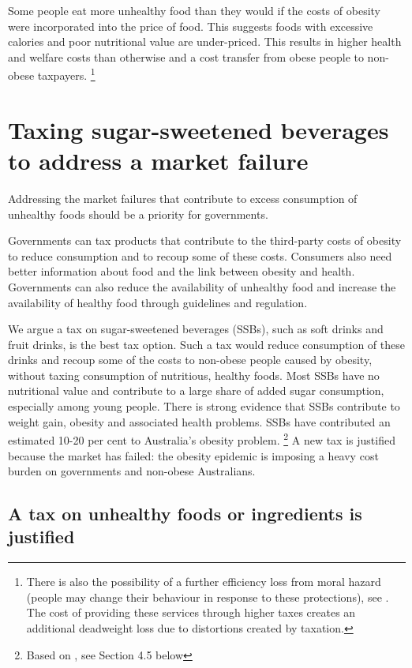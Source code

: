 \documentclass[embargoed]{grattan}
\begin{document}
Some people eat more unhealthy food than they would if the costs of obesity were incorporated into the price of food.
This suggests foods with excessive calories and poor nutritional value are under-priced.
This results in higher health and welfare costs than otherwise and a cost transfer from obese people to non-obese taxpayers.%
\footnote{There is also the possibility of a further efficiency loss from moral hazard (people may change their behaviour in response to these protections), see \textcite{Bhattacharya2011Whopaysobesity}.
The cost of providing these services through higher taxes creates an additional deadweight loss due to distortions created by taxation.}

\chapter{Taxing sugar-sweetened beverages to address a market failure}\label{taxing-sugar-sweetened-beverages-to-address-a-market-failure}

Addressing the market failures that contribute to excess consumption of unhealthy foods should be a priority for governments.

Governments can tax products that contribute to the third-party costs of obesity to reduce consumption and to recoup some of these costs.
Consumers also need better information about food and the link between obesity and health.
Governments can also reduce the availability of unhealthy food and increase the availability of healthy food through guidelines and regulation.

We argue a tax on sugar-sweetened beverages (SSBs), such as soft drinks and fruit drinks, is the best tax option.
Such a tax would reduce consumption of these drinks and recoup some of the costs to non-obese people caused by obesity, without taxing consumption of nutritious, healthy foods.
Most SSBs have no nutritional value and contribute to a large share of added sugar consumption, especially among young people.
There is strong evidence that SSBs contribute to weight gain, obesity and associated health problems.
SSBs have contributed an estimated 10-20 per cent to Australia's obesity problem.%
\footnote{Based on \textcite{Woodward-Lopez2010whatextenthave}, see Section 4.5 below} A new tax is justified because the market has failed: the obesity epidemic is imposing a heavy cost burden on governments and non-obese Australians.

\section{A tax on unhealthy foods or ingredients is justified}\label{a-tax-on-unhealthy-foods-or-ingredients-is-justified}
\end{document}
